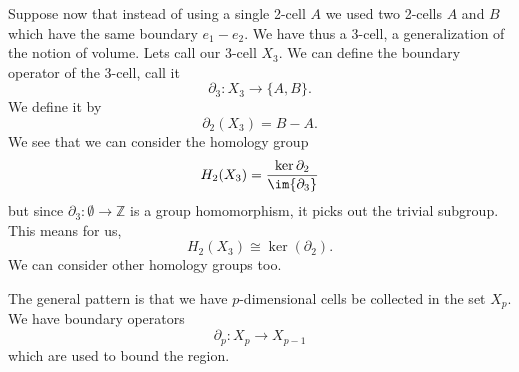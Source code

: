 Suppose now that instead of using a single 2-cell $A$ we used two
2-cells $A$ and $B$ which have the same boundary
$e_{1}-e_{2}$. We have thus a 3-cell, a generalization of the
notion of volume. Lets call our 3-cell $X_{3}$. We can define the
boundary operator of the 3-cell, call it
\begin{equation}
\partial_{3}:X_{3}\to \{A,B\}.
\end{equation}
We define it by
\begin{equation}
\partial_{2}(X_{3})=B-A.
\end{equation}
We see that we can consider the homology group
\begin{equation}
H_{2}(X_{3}) = \frac{\ker{\partial_{2}}}{\im{\partial_{3}}}
\end{equation}
but since $\partial_{3}:\emptyset\to\mathbb{Z}$ is a group
homomorphism, it picks out the trivial subgroup. This means for
us,
\begin{equation}%
H_{2}(X_{3}) \cong \ker(\partial_{2}).
\end{equation}
We can consider other homology groups too.

The general pattern is that we have $p$-dimensional cells be
collected in the set $X_{p}$. We have boundary operators 
\begin{equation}%
\partial_{p}:X_{p}\to X_{p-1}
\end{equation}
which are used to bound the region. 
